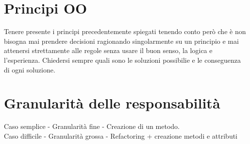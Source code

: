 \section{Principi OO}
Tenere presente i principi precedentemente spiegati tenendo conto però che è non bisogna mai prendere
decisioni ragionando singolarmente su un principio e mai attenersi strettamente alle regole senza usare
il buon senso, la logica e l'esperienza. Chiedersi sempre quali sono le soluzioni possibilie e
le conseguenza di ogni soluzione.
\section{Granularità delle responsabilità}
Caso semplice - Granularità fine - Creazione di un metodo.
\\ Caso difficile - Granularità grossa - Refactoring + creazione metodi e attributi